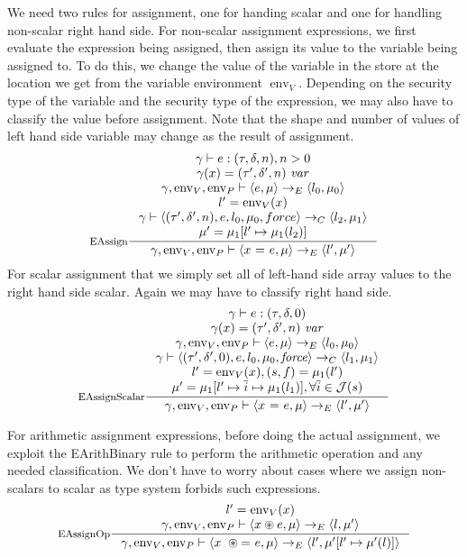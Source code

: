 \documentclass[a4paper, 10pt, draft]{report}
\DeclareMathOperator*{\env}{env}
\DeclareMathOperator*{\force}{\mathit{force}}
\newcommand{\mycode}[1]{\ensuremath{\mbox{\lstinline{#1}}}}
\newcommand{\anyop}{\ensuremath{\circledast}}
\begin{document}
We need two rules for assignment, one for handing scalar and one for handling
non-scalar right hand side.  For non-scalar assignment expressions, we first
evaluate the expression being assigned, then assign its value to the variable
being assigned to.  To do this, we change the value of the variable in the
store at the location we get from the variable environment
$\operatorname{env}_V$. Depending on the security type of the variable and the
security type of the expression, we may also have to classify the value before
assignment. Note that the shape and number of values of left hand side variable
may change as the result of assignment.
\[\inference[EAssign]
{
  \gamma |- e : (\tau, \delta, n), n > 0 \\
  \gamma(x) = (\tau', \delta', n)\ \mathit{var} \\
  \gamma, \env_V, \env_P |- \left< e, \mu \right> \to_E \left< l_0, \mu_0 \right> \\
  l' = \env_V(x) \\
  \gamma |- \left< (\tau', \delta', n), e, l_0, \mu_0, force \right> \to_C \left<l_2, \mu_1 \right> \\
  \mu' = \mu_1[l' \mapsto \mu_1(l_2)]
}{
  \gamma, \env_V, \env_P |- \left< x\ \mycode{=}\ e, \mu \right> \to_E \left< l', \mu' \right>
}\]
For scalar assignment that we simply set all of left-hand side array values to
the right hand side scalar. Again we may have to classify right hand side.
\[\inference[EAssignScalar]
{
  \gamma |- e : (\tau, \delta, 0) \\
  \gamma(x) = (\tau', \delta', n)\ \mathit{var} \\
  \gamma, \env_V, \env_P |- \left< e, \mu \right> \to_E \left< l_0, \mu_0 \right> \\
  \gamma |- \left< (\tau', \delta', 0), e, l_0, \mu_0, \force \right> \to_C \left<l_1, \mu_1 \right> \\
  l' = \env_V(x), (s, f) = \mu_1(l') \\
  \mu' = \mu_1[l' \mapsto \overline{i} \mapsto \mu_1(l_1)], \forall \overline{i} \in \mathcal{J}(s)
}{
  \gamma, \env_V, \env_P |- \left< x\ \mycode{=}\ e, \mu \right> \to_E \left< l', \mu' \right>
}\]

For arithmetic assignment expressions, before doing the actual assignment, we
exploit the EArithBinary rule to perform the arithmetic operation and any
needed classification. We don't have to worry about cases where we assign
non-scalars to scalar as type system forbids such expressions.
\[\inference[EAssignOp]
{
  l' = \env_V(x) \\
  \gamma, \env_V, \env_P |- \left< x \anyop e, \mu \right> \to_E \left< l, \mu' \right>
}{
  \gamma, \env_V, \env_P |- \left< x\ \anyop \mycode{=}\ e, \mu \right> \to_E \left< l', \mu'[l' \mapsto \mu'(l)] \right>
}\]
\end{document}
